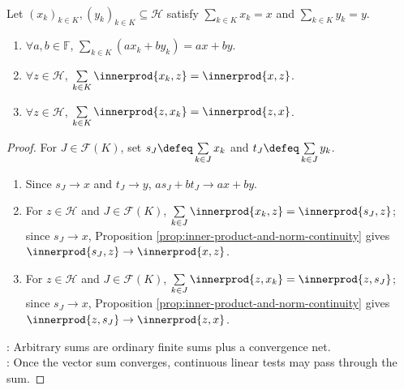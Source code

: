 \begin{proposition} \label{prop:arbitrary-hilbert-sums-basic-properties} \\
Let $(x_k)_{k\in K},(y_k)_{k\in K}\subseteq\mathcal{H}$ satisfy $\sum\limits_{k\in K}x_k=x$ and $\sum\limits_{k\in K}y_k=y$.
\begin{enumerate}[label=(\roman*)]
\setlength{\itemsep}{0pt}
\item $\forall a,b\in\mathbb{F}$, $\sum\limits_{k\in K}(ax_k+by_k)=ax+by$.
\item $\forall z\in\mathcal{H}$, $\sum\limits_{k\in K}\innerprod{x_k,z}=\innerprod{x,z}$.
\item $\forall z\in\mathcal{H}$, $\sum\limits_{k\in K}\innerprod{z,x_k}=\innerprod{z,x}$.
\end{enumerate}
\begin{proof}
For $J\in\mathcal{F}(K)$, set $s_J\defeq\sum\limits_{k\in J}x_k$ and $t_J\defeq\sum\limits_{k\in J}y_k$.
\begin{enumerate}[label=(\roman*)]
\setlength{\itemsep}{0pt}
\item Since $s_J\to x$ and $t_J\to y$, $as_J+bt_J\to ax+by$.
\item For $z\in\mathcal H$ and $J\in\mathcal F(K)$, $\sum\limits_{k\in J}\innerprod{x_k,z}=\innerprod{s_J,z}$; since $s_J\to x$, Proposition \ref{prop:inner-product-and-norm-continuity} gives $\innerprod{s_J,z}\to\innerprod{x,z}$.
\item For $z\in\mathcal H$ and $J\in\mathcal F(K)$, $\sum\limits_{k\in J}\innerprod{z,x_k}=\innerprod{z,s_J}$; since $s_J\to x$, Proposition \ref{prop:inner-product-and-norm-continuity} gives $\innerprod{z,s_J}\to\innerprod{z,x}$.
\end{enumerate}
: Arbitrary sums are ordinary finite sums plus a convergence net.\\
: Once the vector sum converges, continuous linear tests may pass through the sum.
\end{proof}
\end{proposition}

